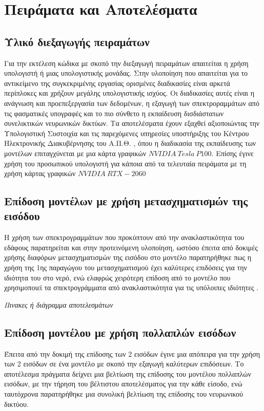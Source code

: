 \chapter{Πειράματα και Αποτελέσματα}
\label{ch:experiments_and_results}

\section{Υλικό διεξαγωγής πειραμάτων}
Για την εκτέλεση κώδικα με σκοπό την διεξαγωγή πειραμάτων απαιτείται η χρήση υπολογιστή ή μιας υπολογιστικής μονάδας. Στην υλοποίηση που απαιτείται για το αντικείμενο της συγκεκριμένης εργασίας ορισμένες διαδικασίες είναι αρκετά περίπλοκες και χρήζουν μεγάλης υπολογιστικής ισχύος. Οι διαδικασίες αυτές είναι η ανάγνωση και προεπεξεργασία των δεδομένων, η εξαγωγή των σπεκτροραμμάτων από τις φασματικές υπογραφές και το πιο σύνθετο η εκπαίδευση δισδιάστατων συνελικτικών νευρωνικών δικτύων.
Τα αποτελέσματα έχουν εξαχθεί αξιοποιώντας την Υπολογιστική Συστοιχία και τις παρεχόμενες υπηρεσίες υποστήριξης του Κέντρου Ηλεκτρονικής Διακυβέρνησης του Α.Π.Θ. \cite{hpcauth}, όπου η διαδικασία της εκπαίδευσης των μοντέλων επιταγχύνεται με μια κάρτα γραφικών $NVIDIA~Tesla~P100$. Επίσης έγινε χρήση του προσωπικού υπολογιστή για κάποια από τα τελευταία πειράματα με τη χρήση κάρτας γραφικών $NVIDIA~RTX-2060$

\section{Επίδοση μοντέλων με χρήση μετασχηματισμών της εισόδου }
Η χρήση των σπεκτρογραμμάτων που προκύπτουν από την ανακλαστικότητα  του εδάφους παρατηρείται και στην προτεινόμενη υλοποίηση, ωστόσο έπειτα από δοκιμές χρήσης διαφόρων μετασχηματισμών της εισόδου στο μοντέλο παρατηρήθηκε πως η χρήση της 1ης παραγώγου του μετασχηματισμού  έχει καλύτερες επιδόσεις για την ιδιότητα του  στο νερό, ενώ ελαφρώς χειρότερη επίδοση από το μοντέλο που χρησιμοποιεί τα σπεκτρογράμματα από ανακλαστικότητα για τις υπόλοιπες ιδιότητες .

\textit{Πινακες ή διάγραμμα αποτελεσμάτων}

\section{Επίδοση μοντέλου με χρήση πολλαπλών εισόδων}
Έπειτα από την δοκιμή της επίδοσης των 2 εισόδων έγινε μια απόπειρα για την χρήση των 2 εισόδων σε ένα μοντέλο με σκοπό την εξαγωγή καλύτερων επιδόσεων. Το αποτέλεσμα πράγματα δείχνει μια βελτίωση της επίδοσης του μοντέλου πολλαπλών εισόδων, με την τήρηση του βέλτιστου αποτελέσματος για την κάθε είσοδο, ενώ ταυτόχρονα παρατηρήθηκε μια συνολική βελτίωση της επίδοσης του νευρωνικού δικτύου.

